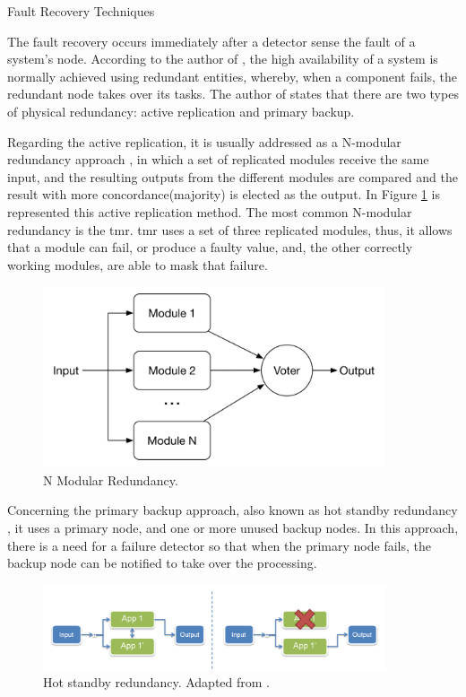 \begin{Paragraph}{Fault Recovery Techniques}

The fault recovery occurs immediately after a detector sense the fault of a system's node. According to the author of \cite{Schweiz}, the high availability of a system is normally achieved using redundant entities, whereby, when a component fails, the redundant node takes over its tasks. The author of \cite{Redwine} states that there are two types of physical redundancy: active replication and primary backup. 

Regarding the active replication, it is usually addressed as a N-modular redundancy approach \cite{Schweiz}, in which a set of replicated modules receive the same input, and the resulting outputs from the different modules are compared and the result with more concordance(majority) is elected as the output. In Figure \ref{fig:nmodular} is represented this active replication method. The most common N-modular redundancy is the \acf{tmr}. \ac{tmr} uses a set of three replicated modules, thus, it allows that a module can fail, or produce a faulty value, and, the other correctly working modules, are able to mask that failure. 
	
	\begin{figure}[H]
		\centering
		\includegraphics[width=0.9\textwidth]{figures/nmodular.png}
		\caption{N Modular Redundancy.}
		\label{fig:nmodular}
	\end{figure}

Concerning the primary backup approach, also known as hot standby redundancy \cite{Schweiz}, it uses a primary node, and one or more unused backup nodes. In this approach, there is a need for a failure detector so that when the primary node fails, the backup node can be notified to take over the processing. 

	\begin{figure}[H]
		\centering
		\includegraphics[width=0.9\textwidth]{figures/hotstandby.png}
		\caption{Hot standby redundancy. Adapted from \cite{Schweiz}.}
		\label{fig:hot_standby}
	\end{figure}
	
\end{Paragraph}



